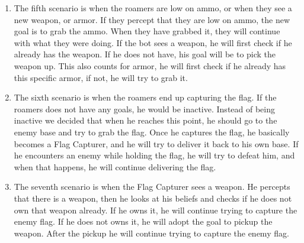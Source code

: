 \begin{enumerate}
	\item The fifth scenario is when the roamers are low on ammo, or when they see a new weapon, or armor. If they percept that they are low on ammo, the new goal is to grab the ammo. When they have grabbed it, they will continue with what they were doing. If the bot sees a weapon, he will first check if he already has the weapon. If he does not have, his goal will be to pick the weapon up. This also counts for armor, he will first check if he already has this specific armor, if not, he will try to grab it. \\
	\item The sixth scenario is when the roamers end up capturing the flag. If the roamers does not have any goals, he would be inactive. Instead of being inactive we decided that when he reaches this point, he should go to the enemy base and try to grab the flag. Once he captures the flag, he basically becomes a Flag Capturer, and he will try to deliver it back to his own base. If he encounters an enemy while holding the flag, he will try to defeat him, and when that happens, he will continue delivering the flag.\\ 
	\item The seventh scenario is when the Flag Capturer sees a weapon. He percepts that there is a weapon, then he looks at his beliefs and checks if he does not own that weapon already. If he owns it, he will continue trying to capture the enemy flag. If he does not owns it, he will adopt the goal to pickup the weapon. After the pickup he will continue trying to capture the enemy flag.
\end{enumerate}